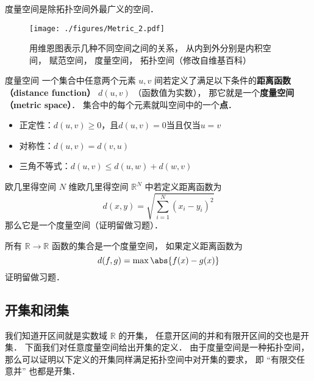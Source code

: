 

度量空间是除拓扑空间外最广义的空间．
\begin{figure}[ht]
\centering
\texttt{[image: ./figures/Metric\_2.pdf]}
\caption{用维恩图表示几种不同空间之间的关系， 从内到外分别是内积空间， 赋范空间， 度量空间， 拓扑空间（修改自维基百科）} \label{Metric_fig2}
\end{figure}

\begin{definition}{度量空间}
一个集合中任意两个元素 $u, v$ 间若定义了满足以下条件的\textbf{距离函数（distance function）} $d(u, v)$ （函数值为实数）， 那它就是一个\textbf{度量空间（metric space）}． 集合中的每个元素就叫空间中的一个\textbf{点}．
\begin{itemize}
\item 正定性：$d(u, v) \geq 0$，且$d(u, v)=0$当且仅当$u=v$
\item 对称性：$d(u, v) = d(v, u)$
\item 三角不等式：$d(u, v) \leqslant d(u, w) + d(w, v)$
\end{itemize}
\end{definition}

\begin{example}{欧几里得空间}
$N$ 维欧几里得空间 $\mathbb R^N$ 中若定义距离函数为
\begin{equation}
d(x, y) = \sqrt{\sum_{i=1}^N (x_i - y_i)^2}
\end{equation}
那么它是一个度量空间（证明留做习题）．
\end{example}

\begin{example}{}
所有 $\mathbb R \to \mathbb R$ 函数的集合是一个度量空间， 如果定义距离函数为
\begin{equation}
d(f, g) = \max{\abs{f(x) - g(x)}}
\end{equation}
证明留做习题．
\end{example}

\subsection{开集和闭集}
我们知道开区间就是实数域 $\mathbb R$ 的开集， 任意开区间的并和有限开区间的交也是开集． 下面我们对任意度量空间给出开集的定义． 由于度量空间是一种拓扑空间， 那么可以证明以下定义的开集同样满足拓扑空间中对开集的要求， 即 “有限交任意并” 也都是开集．

